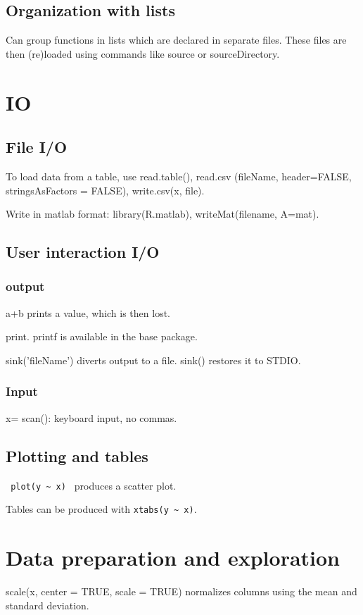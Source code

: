 \documentclass[oneside, article]{memoir}
\begin{document}
\subsection{Organization with lists}
Can group functions in lists which are declared in separate files. These files are then (re)loaded using commands like source or sourceDirectory.

\section{IO}
\subsection{File I/O}
To load data from a table, use read.table(), read.csv (fileName, header=FALSE, stringsAsFactors = FALSE), write.csv(x, file).

Write in matlab format: library(R.matlab), writeMat(filename, A=mat).

\subsection{User interaction I/O}
\subsubsection{output}
a+b prints a value, which is then lost.

print. printf is available in the base package.

sink('fileName') diverts output to a file. sink() restores it to STDIO.

\subsubsection{Input}
x= scan(): keyboard input, no commas.

\subsection{Plotting and tables}
\verb' plot(y ~ x) ' produces a scatter plot.

Tables can be produced with \verb'xtabs(y ~ x)'.

\section{Data preparation and exploration}
scale(x, center = TRUE, scale = TRUE) normalizes columns using the mean and standard deviation.
\end{document}
